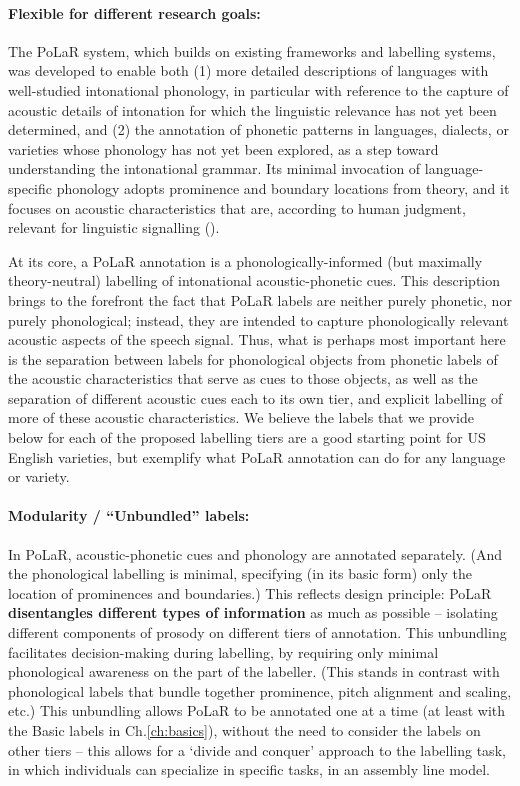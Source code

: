 \paragraph{Flexible for different research goals:}
The PoLaR system, which builds on existing frameworks and labelling systems, was developed to enable both (1) more detailed descriptions of languages with well-studied intonational phonology, in particular with reference to the capture of acoustic details of intonation for which the linguistic relevance has not yet been determined, and (2) the annotation of phonetic patterns in languages, dialects, or varieties whose phonology has not yet been explored, as a step toward understanding the intonational grammar. Its minimal invocation of language-specific phonology adopts prominence and boundary locations from \DIFdelbegin {}\DIFdelend \DIFaddbegin {}\DIFaddend theory, and it focuses on acoustic characteristics that are, according to human judgment, relevant for linguistic signalling (\citealt{barnesshattuckhufnagel20}).   

At its core, a PoLaR annotation is a phonologically-informed (but maximally theory-neutral) labelling of intonational acoustic-phonetic cues. This description brings to the forefront the fact that PoLaR labels are neither purely phonetic, nor purely phonological; instead, they are intended to capture phonologically relevant acoustic aspects of the speech signal. Thus, what is perhaps most important here is the separation between labels for phonological objects from phonetic labels of the acoustic characteristics that serve as cues to those objects, as well as the separation of different acoustic cues each to its own tier, and explicit labelling of more of these acoustic characteristics. We believe the labels that we provide below for each of the proposed labelling tiers are a good starting point for US English varieties, but exemplify what PoLaR annotation can do for any language or variety.

\paragraph{Modularity / “Unbundled” labels:}
In PoLaR, acoustic-phonetic cues and phonology are annotated separately. (And the phonological labelling is minimal, specifying (in its basic form) only the location of prominences and boundaries.) This reflects design principle: PoLaR \textbf{disentangles different types of information} as much as possible – isolating different components of prosody on different tiers of annotation. This unbundling facilitates decision-making during labelling, by requiring only minimal phonological awareness on the part of the labeller. (This stands in contrast with phonological labels that bundle together prominence, pitch alignment and scaling, etc.) This unbundling allows PoLaR to be annotated one at a time (at least with the Basic labels in Ch.\ref{ch:basics}), without the need to consider the labels on other tiers – this allows for a ‘divide and conquer’ approach to the labelling task, in which individuals can specialize in specific tasks, in an assembly line model.

